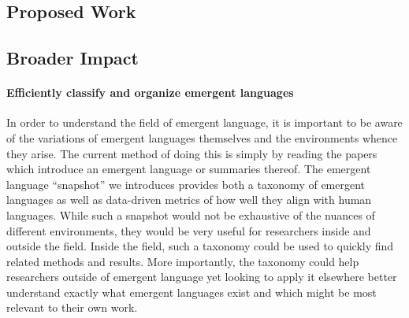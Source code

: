 \subsection{Proposed Work}



\subsection{Broader Impact}


\paragraph{Efficiently classify and organize emergent languages}
In order to understand the field of emergent language, it is important to be aware of the variations of emergent languages themselves and the environments whence they arise.
The current method of doing this is simply by reading the papers which introduce an emergent language or summaries thereof.
The emergent language ``snapshot'' we introduces provides both a taxonomy of emergent languages as well as data-driven metrics of how well they align with human languages.
While such a snapshot would not be exhaustive of the nuances of different environments, they would be very useful for researchers inside and outside the field.
Inside the field, such a taxonomy could be used to quickly find related methods and results.
More importantly, the taxonomy could help researchers outside of emergent language yet looking to apply it elsewhere better understand exactly what emergent languages exist and which might be most relevant to their own work.

